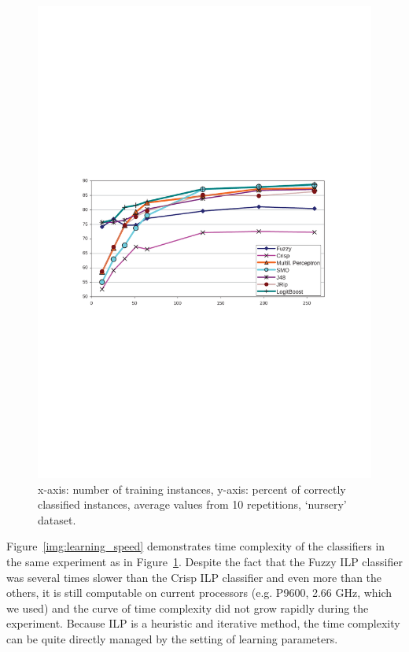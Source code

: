 \begin{figure}
\centerline{\includegraphics[width=0.8\hsize]{corect_growing_learninig_instances}}
\caption{x-axis: number of training instances, y-axis: percent of correctly classified instances, average values from 10 repetitions, `nursery' dataset.}
\label{img:corect_growing_learninig_instances}
\end{figure}

Figure~\ref{img:learning_speed} demonstrates time complexity of the classifiers in the same experiment as in Figure~\ref{img:corect_growing_learninig_instances}. Despite the fact that the Fuzzy ILP classifier was several times slower than the Crisp ILP classifier and even more than the others, it is still computable on current processors (e.g. P9600, 2.66 GHz, which we used) and the curve of time complexity did not grow rapidly during the experiment. Because ILP is a heuristic and iterative method, the time complexity can be quite directly managed by the setting of learning parameters.

